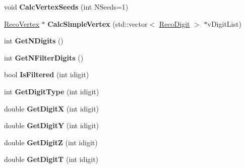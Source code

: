 \begin{DoxyCompactItemize}
\item 
\hypertarget{classVertexGeometry_a61e0d6fc22938b6726699bb425129b83}{void {\bfseries Calc\-Vertex\-Seeds} (int N\-Seeds=1)}\label{classVertexGeometry_a61e0d6fc22938b6726699bb425129b83}

\item 
\hypertarget{classVertexGeometry_a7e8e9251a3c47688ba54c942416bf2e3}{\hyperlink{classRecoVertex}{Reco\-Vertex} $\ast$ {\bfseries Calc\-Simple\-Vertex} (std\-::vector$<$ \hyperlink{classRecoDigit}{Reco\-Digit} $>$ $\ast$v\-Digit\-List)}\label{classVertexGeometry_a7e8e9251a3c47688ba54c942416bf2e3}

\item 
\hypertarget{classVertexGeometry_a15716dd74083e985ff6a60160adcf01b}{int {\bfseries Get\-N\-Digits} ()}\label{classVertexGeometry_a15716dd74083e985ff6a60160adcf01b}

\item 
\hypertarget{classVertexGeometry_a55c6663325dadb26600618c28dded497}{int {\bfseries Get\-N\-Filter\-Digits} ()}\label{classVertexGeometry_a55c6663325dadb26600618c28dded497}

\item 
\hypertarget{classVertexGeometry_aa59b350bd91ef0cbcff246c39a726428}{bool {\bfseries Is\-Filtered} (int idigit)}\label{classVertexGeometry_aa59b350bd91ef0cbcff246c39a726428}

\item 
\hypertarget{classVertexGeometry_ac01a580d673a95d8f534a5f4e65592b7}{int {\bfseries Get\-Digit\-Type} (int idigit)}\label{classVertexGeometry_ac01a580d673a95d8f534a5f4e65592b7}

\item 
\hypertarget{classVertexGeometry_a523bcf337cbab4a2e36934e1f70cfe87}{double {\bfseries Get\-Digit\-X} (int idigit)}\label{classVertexGeometry_a523bcf337cbab4a2e36934e1f70cfe87}

\item 
\hypertarget{classVertexGeometry_aa3742471e098741489cfac41ab9cdb99}{double {\bfseries Get\-Digit\-Y} (int idigit)}\label{classVertexGeometry_aa3742471e098741489cfac41ab9cdb99}

\item 
\hypertarget{classVertexGeometry_a72dd6074b8100870aeee8cc52c308980}{double {\bfseries Get\-Digit\-Z} (int idigit)}\label{classVertexGeometry_a72dd6074b8100870aeee8cc52c308980}

\item 
\hypertarget{classVertexGeometry_aadf7fd1ade32fd7058a767f643d93ce8}{double {\bfseries Get\-Digit\-T} (int idigit)}\label{classVertexGeometry_aadf7fd1ade32fd7058a767f643d93ce8}


\end{DoxyCompactItemize}
